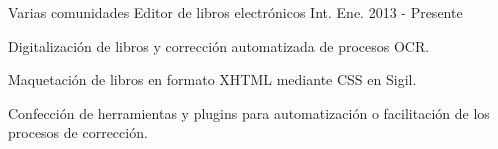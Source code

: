 


\begin{cventries}

  \cventry
    {Varias comunidades} %
    {Editor de libros electrónicos} %
    {Int.} %
    {Ene. 2013 - Presente} %
    {
      \begin{cvitems} %
        \item {Digitalización de libros y corrección automatizada de procesos OCR.}
        \item {Maquetación de libros en formato XHTML mediante CSS en Sigil.}
        \item {Confección de herramientas y plugins para automatización o facilitación de los procesos de corrección.}
      \end{cvitems}
    }


\end{cventries}
